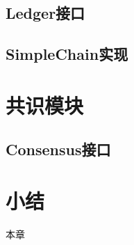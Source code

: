 \subsection{Ledger接口}

\subsection{SimpleChain实现}

\section{共识模块}

\subsection{Consensus接口}

\section{小结}

本章

